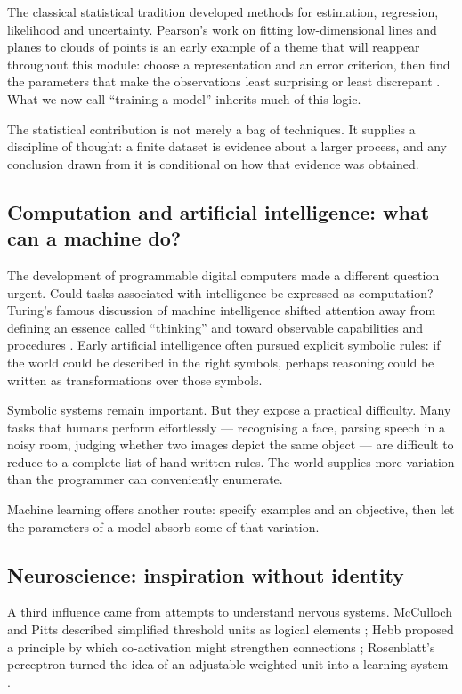 The classical statistical tradition developed methods for estimation, regression, likelihood and uncertainty. Pearson's work on fitting low-dimensional lines and planes to clouds of points is an early example of a theme that will reappear throughout this module: choose a representation and an error criterion, then find the parameters that make the observations least surprising or least discrepant \parencite{pearson1901}. What we now call ``training a model'' inherits much of this logic.

The statistical contribution is not merely a bag of techniques. It supplies a discipline of thought: a finite dataset is evidence about a larger process, and any conclusion drawn from it is conditional on how that evidence was obtained.

\subsection{Computation and artificial intelligence: what can a machine do?}

The development of programmable digital computers made a different question urgent. Could tasks associated with intelligence be expressed as computation? Turing's famous discussion of machine intelligence shifted attention away from defining an essence called ``thinking'' and toward observable capabilities and procedures \parencite{turing1950}. Early artificial intelligence often pursued explicit symbolic rules: if the world could be described in the right symbols, perhaps reasoning could be written as transformations over those symbols.

Symbolic systems remain important. But they expose a practical difficulty. Many tasks that humans perform effortlessly --- recognising a face, parsing speech in a noisy room, judging whether two images depict the same object --- are difficult to reduce to a complete list of hand-written rules. The world supplies more variation than the programmer can conveniently enumerate.

Machine learning offers another route: specify examples and an objective, then let the parameters of a model absorb some of that variation.

\subsection{Neuroscience: inspiration without identity}

A third influence came from attempts to understand nervous systems. McCulloch and Pitts described simplified threshold units as logical elements \parencite{mcculloch1943}; Hebb proposed a principle by which co-activation might strengthen connections \parencite{hebb1949}; Rosenblatt's perceptron turned the idea of an adjustable weighted unit into a learning system \parencite{rosenblatt1958}.

